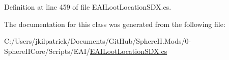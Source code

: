 Definition at line 459 of file E\+A\+I\+Loot\+Location\+S\+D\+X.\+cs.



The documentation for this class was generated from the following file\+:\begin{DoxyCompactItemize}
\item 
C\+:/\+Users/jkilpatrick/\+Documents/\+Git\+Hub/\+Sphere\+I\+I.\+Mods/0-\/\+Sphere\+I\+I\+Core/\+Scripts/\+E\+A\+I/\mbox{\hyperlink{_e_a_i_loot_location_s_d_x_8cs}{E\+A\+I\+Loot\+Location\+S\+D\+X.\+cs}}\end{DoxyCompactItemize}
